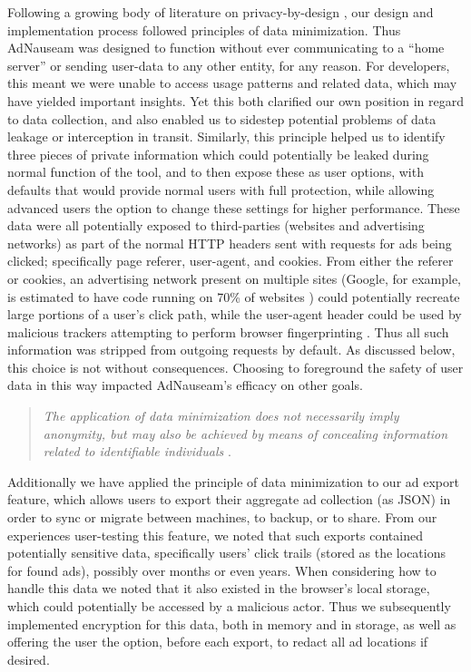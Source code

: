 \documentclass[conference]{IEEEtran}
\begin{document}
Following a growing body of literature on privacy-by-design \cite{Gurses-0, Hoepman, Gurses-1, Hansen, Cavoukian}, our design and implementation process followed principles of data minimization. Thus AdNauseam was designed to function without ever communicating to a “home server” or sending user-data to any other entity, for any reason. For developers, this meant we were unable to access usage patterns and related data, which may have yielded important insights. Yet this both clarified our own position in regard to data collection, and also enabled us to sidestep potential problems of data leakage or interception in transit. Similarly, this principle helped us to identify three pieces of private information which could potentially be leaked during normal function of the tool, and to then expose these as user options, with defaults that would provide normal users with full protection, while allowing advanced users the option to change these settings for higher performance. These data were all potentially exposed to third-parties (websites and advertising networks) as part of the normal HTTP headers sent with requests for ads being clicked; specifically page referer, user-agent, and cookies. From either the referer or cookies, an advertising network present on multiple sites (Google, for example, is estimated to have code running on 70\% of websites \cite{Englehardt}) could potentially recreate large portions of a user's click path, while the user-agent header could be used by malicious trackers attempting to perform browser fingerprinting \cite{Nikiforakis}. Thus all such information was stripped from outgoing requests by default. As discussed below, this choice is not without consequences. Choosing to foreground the safety of user data in this way impacted AdNauseam's efficacy on other goals.

\vspace{2mm}
\blockquote{\emph{The application of data minimization does not necessarily imply anonymity, but may also be achieved by means of concealing information related to identifiable individuals} \cite{Gurses-0}.}
\vspace{1mm}

\noindent Additionally we have applied the principle of data minimization to our ad export feature, which allows users to export their aggregate ad collection (as JSON) in order to sync or migrate between machines, to backup, or to share. From our experiences user-testing this feature, we noted that such exports contained potentially sensitive data, specifically users' click trails (stored as the locations for found ads), possibly over months or even years. When considering how to handle this data we noted that it also existed in the browser's local storage, which could potentially be accessed by a malicious actor. Thus we subsequently implemented encryption for this data, both in memory and in storage, as well as offering the user the option, before each export, to redact all ad locations if desired.
\end{document}
